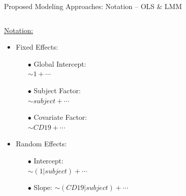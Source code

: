 \documentclass[11pt]{beamer}
\begin{document}
\begin{frame}{Proposed Modeling Approaches: Notation -- OLS \& LMM}

\begin{columns}



\begin{column}{0.47\textwidth}
\underline{Notation:}
		\vspace{5pt}
		\begin{itemize}
			\item Fixed Effects:
			\begin{itemize}
				\item[$\bullet$] Global Intercept:\\[0.5em] \hspace{5pt} $\sim 1+\cdots$\\[0.5em]
				\item[$\bullet$] Subject Factor: \\[0.5em] \hspace{5pt} $\sim subject+\cdots$\\[0.5em]
				\item[$\bullet$] Covariate Factor:\\[0.5em] \hspace{5pt}  $\sim CD19 +\cdots$\\[0.5em]
			\end{itemize}
			\item Random Effects:
			\begin{itemize}
				\item[$\bullet$] Intercept: \\[0.5em] \hspace{5pt} $\sim (1|subject)+\cdots$\\[0.5em]
				\item[$\bullet$] Slope:  \hspace{5pt} $\sim (CD19|subject) +\cdots$\\[0.5em]
			\end{itemize}
		\end{itemize}
\end{column}


\end{columns}
\end{frame}
\end{document}
